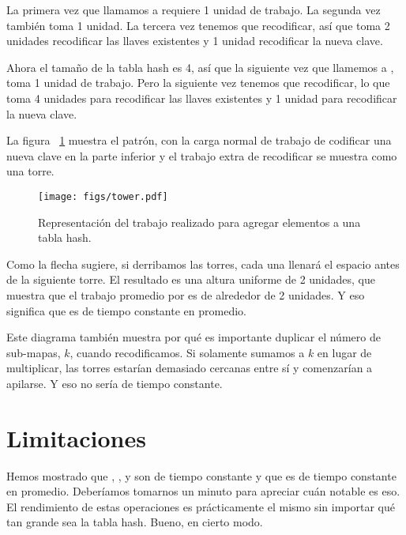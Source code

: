 \documentclass[12pt]{book}
\theoremstyle{exercise}
\begin{document}

La primera vez que llamamos a  requiere 1 unidad de trabajo. La segunda
vez también toma 1 unidad. La tercera vez tenemos que recodificar, así que
toma 2 unidades recodificar las llaves existentes y 1 unidad recodificar la
nueva clave.

Ahora el tamaño de la tabla hash es 4, así que la siguiente vez que llamemos
a , toma 1 unidad de trabajo. Pero la siguiente vez tenemos que
recodificar, lo que toma 4 unidades para recodificar las llaves existentes y 1
unidad para recodificar la nueva clave.


La figura ~\ref{fig-hashtable} muestra el patrón, con la carga normal de trabajo de
codificar una nueva clave en la parte inferior y el trabajo extra de recodificar se
muestra como una torre.

\begin{figure}
\centerline{\texttt{[image: figs/tower.pdf]}}
\caption{Representación del trabajo realizado para agregar elementos a una tabla hash.}
\label{fig-hashtable}
\end{figure}

Como la flecha sugiere, si derribamos las torres, cada una llenará el
espacio antes de la siguiente torre. El resultado es una altura uniforme
de 2 unidades, que muestra que el trabajo promedio por  es de alrededor
de 2 unidades. Y eso significa que  es de tiempo constante en promedio.

Este diagrama también muestra por qué es importante duplicar el número de
sub-mapas, $k$, cuando recodificamos. Si solamente sumamos a $k$
en lugar de multiplicar, las torres estarían demasiado cercanas entre sí
y comenzarían a apilarse. Y eso no sería de tiempo constante.



\section{Limitaciones}
\label{the-tradeoffs}

Hemos mostrado que , , y 
son de tiempo constante y que  es de tiempo constante en
promedio. Deberíamos tomarnos un minuto para apreciar cuán notable
es eso. El rendimiento de estas operaciones es prácticamente el mismo
sin importar qué tan grande sea la tabla hash. Bueno, en cierto modo.
\end{document}
